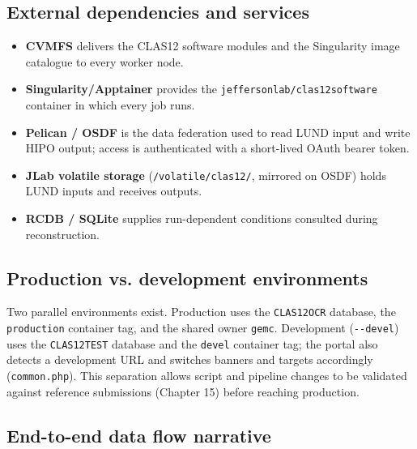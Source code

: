 \subsection{External dependencies and services}

\begin{itemize}
  \item \textbf{CVMFS} delivers the CLAS12 software modules and the Singularity image catalogue to every worker node.
  \item \textbf{Singularity/Apptainer} provides the \texttt{jeffersonlab/\allowbreak{}clas12software} container in which every job runs.
  \item \textbf{Pelican / OSDF} is the data federation used to read LUND input and write HIPO output; access is authenticated with a short-lived OAuth bearer token.
  \item \textbf{JLab volatile storage} (\texttt{/\allowbreak{}volatile/\allowbreak{}clas12/\allowbreak{}}, mirrored on OSDF) holds LUND inputs and receives outputs.
  \item \textbf{RCDB / SQLite} supplies run-dependent conditions consulted during reconstruction.
\end{itemize}

\subsection{Production vs. development environments}

Two parallel environments exist. Production uses the \texttt{CLAS12OCR} database, the \texttt{production} container tag, and the shared owner \texttt{gemc}. Development (\texttt{-\allowbreak{}-\allowbreak{}devel}) uses the \texttt{CLAS12TEST} database and the \texttt{devel} container tag; the portal also detects a development URL and switches banners and targets accordingly (\texttt{common.\allowbreak{}php}). This separation allows script and pipeline changes to be validated against reference submissions (Chapter 15) before reaching production.

\subsection{End-to-end data flow narrative}

